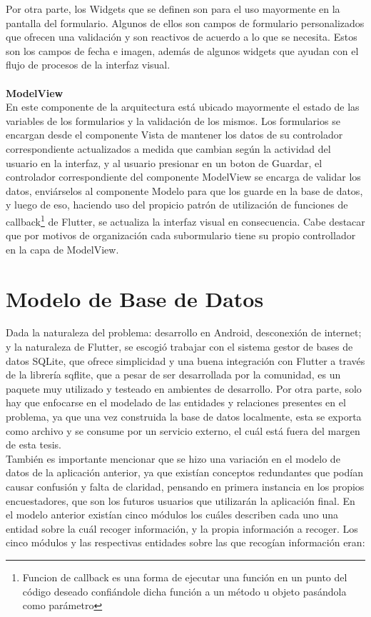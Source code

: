 Por otra parte, los Widgets que se definen son para el uso mayormente en la pantalla del formulario. Algunos de ellos son campos de formulario personalizados que
ofrecen una validación y son reactivos de acuerdo a lo que se necesita. Estos son los campos de fecha e imagen, además de algunos widgets que ayudan con el flujo
de procesos de la interfaz visual.
\\\\
\textbf{ModelView}\\
En este componente de la arquitectura está ubicado mayormente el estado de las variables de los formularios y la validación de los mismos. Los formularios se encargan
desde el componente Vista de mantener los datos de su controlador correspondiente actualizados a medida que cambian según la actividad del usuario en la interfaz,
y al usuario presionar en un boton de Guardar, el controlador correspondiente del componente ModelView se encarga de validar los datos, enviárselos al componente Modelo
para que los guarde en la base de datos, y luego de eso, haciendo uso del propicio patrón de utilización de funciones de callback\footnote{Funcion de callback es una
    forma de ejecutar una función en un punto del código deseado confiándole dicha función a un método u objeto pasándola como parámetro} de Flutter, se actualiza la interfaz
visual en consecuencia. Cabe destacar que por motivos de organización cada subormulario tiene su propio controllador en la capa de ModelView.
\\
\section{Modelo de Base de Datos}
Dada la naturaleza del problema: desarrollo en Android, desconexión de internet; y la naturaleza de Flutter, se escogió trabajar con el sistema gestor de bases de datos SQLite,
que ofrece simplicidad y una buena integración con Flutter a través de la librería sqflite, que a pesar de ser desarrollada por la comunidad, es un paquete muy utilizado y
testeado en ambientes de desarrollo. Por otra parte, solo hay que enfocarse en el modelado de las entidades y relaciones presentes en el problema, ya que una vez construida
la base de datos localmente, esta se exporta como archivo y se consume por un servicio externo, el cuál está fuera del margen de esta tesis.\\
También es importante mencionar que se hizo una variación en el modelo de datos de la aplicación anterior, ya que existían conceptos redundantes que podían causar confusión y
falta de claridad, pensando en primera instancia en los propios encuestadores, que son los futuros usuarios que utilizarán la aplicación final. En el modelo anterior existían
cinco módulos los cuáles describen cada uno una entidad sobre la cuál recoger información, y la propia información a recoger. Los cinco módulos y las respectivas entidades sobre
las que recogían información eran:

